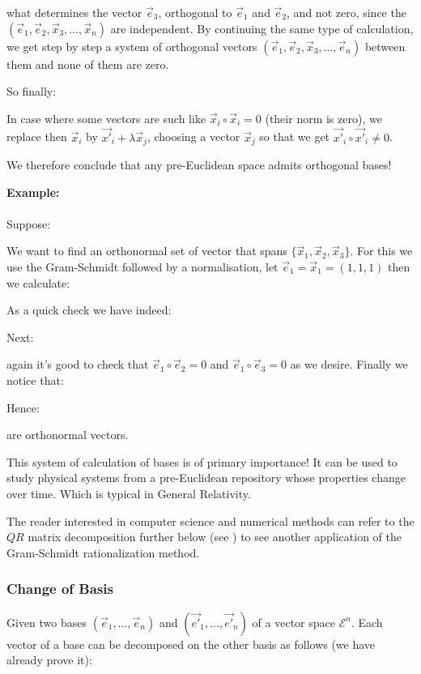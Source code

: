 	what determines the vector $\vec{e}_3$, orthogonal to $\vec{e}_1$ and $\vec{e}_2$, and not zero, since the $(\vec{e}_1,\vec{e}_2,\vec{x}_3,\ldots,\vec{x}_n)$ are independent. By continuing the same type of calculation, we get step by step a system of orthogonal vectors $(\vec{e}_1,\vec{e}_2,\vec{x}_3,\ldots,\vec{e}_n)$ between them and none of them are zero.
	
	So finally:
	
	
	In case where some vectors are such like $\vec{x}_i\circ\vec{x}_i=0$ (their norm is zero), we replace then $\vec{x}_i$ by $\vec{x'}_i+\lambda\vec{x}_j$, choosing a vector $\vec{x}_j$ so that we get $\vec{x'}_i\circ\vec{x'}_i\neq 0$.
	
	We therefore conclude that any pre-Euclidean space admits orthogonal bases!
	\begin{tcolorbox}[colframe=black,colback=white,sharp corners]
	\textbf{{\Large {}}Example:}\\\\
	Suppose:
	
	We want to find an orthonormal set of vector that spans $\{\vec{x}_1,\vec{x}_2,\vec{x}_3\}$. For this we use the Gram-Schmidt followed by a normalisation, let $\vec{e}_1=\vec{x}_1=(1,1,1)$ then we calculate:
	
	As a quick check we have indeed:
	
	Next:
	
	again it's good to check that $\vec{e}_1\circ\vec{e}_2=0$ and $\vec{e}_1\circ\vec{e}_3=0$ as we desire. Finally we notice that:
	
	Hence:
	
	are orthonormal vectors.
	\end{tcolorbox}
	
	This system of calculation of bases is of primary importance! It can be used to study physical systems from a pre-Euclidean repository whose properties change over time. Which is typical in General Relativity. 
	
	The reader interested in computer science and numerical methods can refer to the $QR$ matrix decomposition further below (see \pageref{QR decomposition}) to see another application of the Gram-Schmidt rationalization method.

	\subsubsection{Change of Basis}\label{change of basis tensor calculus}
	Given two bases $(\vec{e}_1,\ldots,\vec{e}_n)$ and $(\vec{e'}_1,\ldots,\vec{e'}_n)$ of a vector space $\mathcal{E}^n$. Each vector of a base can be decomposed on the other basis as follows (we have already prove it):
	
